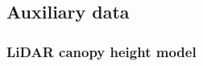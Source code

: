 

\subsection{Auxiliary data}
\label{sec:auxinfo}

\subsubsection{LiDAR canopy height model}
\label{sec:chm}

